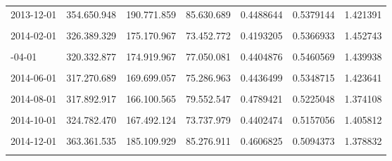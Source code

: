 \documentclass[12pt]{article}
\begin{document}
\begin{longtable}[t]{llllrrr}
2013-12-01 & 354.650.948 & 190.771.859 & 85.630.689 & 0.4488644 & 0.5379144 & 1.421391\\
\cellcolor{gray!10}{2014-01-01} & \cellcolor{gray!10}{323.274.695} & \cellcolor{gray!10}{173.300.906} & \cellcolor{gray!10}{72.973.330} & \cellcolor{gray!10}{0.4210788} & \cellcolor{gray!10}{0.5360794} & \cellcolor{gray!10}{1.450006}\\
2014-02-01 & 326.389.329 & 175.170.967 & 73.452.772 & 0.4193205 & 0.5366933 & 1.452743\\
\cellcolor{gray!10}{2014-03-01} & \cellcolor{gray!10}{321.036.411} & \cellcolor{gray!10}{174.460.885} & \cellcolor{gray!10}{81.438.522} & \cellcolor{gray!10}{0.4668010} & \cellcolor{gray!10}{0.5434302} & \cellcolor{gray!10}{1.407968}\\
\addlinespace
2014-04-01 & 320.332.877 & 174.919.967 & 77.050.081 & 0.4404876 & 0.5460569 & 1.439938\\
\cellcolor{gray!10}{2014-05-01} & \cellcolor{gray!10}{314.796.451} & \cellcolor{gray!10}{168.512.887} & \cellcolor{gray!10}{68.488.291} & \cellcolor{gray!10}{0.4064276} & \cellcolor{gray!10}{0.5353075} & \cellcolor{gray!10}{1.465725}\\
2014-06-01 & 317.270.689 & 169.699.057 & 75.286.963 & 0.4436499 & 0.5348715 & 1.423641\\
\cellcolor{gray!10}{2014-07-01} & \cellcolor{gray!10}{313.720.506} & \cellcolor{gray!10}{165.291.106} & \cellcolor{gray!10}{75.165.288} & \cellcolor{gray!10}{0.4547449} & \cellcolor{gray!10}{0.5268738} & \cellcolor{gray!10}{1.403077}\\
2014-08-01 & 317.892.917 & 166.100.565 & 79.552.547 & 0.4789421 & 0.5225048 & 1.374108\\
\addlinespace
\cellcolor{gray!10}{2014-09-01} & \cellcolor{gray!10}{325.937.821} & \cellcolor{gray!10}{170.413.242} & \cellcolor{gray!10}{82.884.803} & \cellcolor{gray!10}{0.4863754} & \cellcolor{gray!10}{0.5228397} & \cellcolor{gray!10}{1.367135}\\
2014-10-01 & 324.782.470 & 167.492.124 & 73.737.979 & 0.4402474 & 0.5157056 & 1.405812\\
\cellcolor{gray!10}{2014-11-01} & \cellcolor{gray!10}{338.309.402} & \cellcolor{gray!10}{175.547.059} & \cellcolor{gray!10}{78.863.220} & \cellcolor{gray!10}{0.4492426} & \cellcolor{gray!10}{0.5188950} & \cellcolor{gray!10}{1.400139}\\
2014-12-01 & 363.361.535 & 185.109.929 & 85.276.911 & 0.4606825 & 0.5094373 & 1.378832\\
\cellcolor{gray!10}{2015-01-01} & \cellcolor{gray!10}{333.454.078} & \cellcolor{gray!10}{170.885.983} & \cellcolor{gray!10}{75.956.597} & \cellcolor{gray!10}{0.4444870} & \cellcolor{gray!10}{0.5124723} & \cellcolor{gray!10}{1.397986}\\

\end{longtable}
\end{document}
